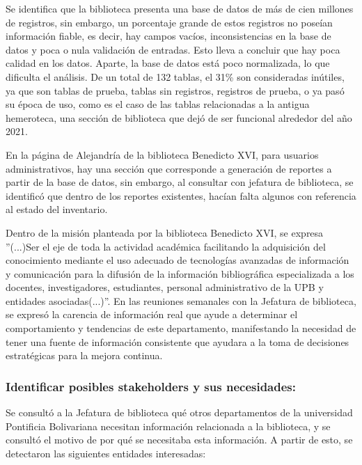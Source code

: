 \documentclass[spanish]{ieee_upb}
\begin{document}
\vspace{0.3cm}
Se identifica que la biblioteca presenta una base de datos de más de cien millones de registros, sin embargo, un porcentaje grande de estos registros no poseían información fiable, es decir, hay campos vacíos, inconsistencias en la base de datos y poca o nula validación de entradas. Esto lleva a concluir que hay poca calidad en los datos. Aparte, la base de datos está poco normalizada, lo que dificulta el análisis. De un total de 132 tablas, el 31\% son consideradas inútiles, ya que son tablas de prueba, tablas sin registros, registros de prueba, o ya pasó su época de uso, como es el caso de las tablas relacionadas a la antigua hemeroteca, una sección de biblioteca que dejó de ser funcional alrededor del año 2021. 

\vspace{0.3cm}
En la página de Alejandría de la biblioteca Benedicto XVI, para usuarios administrativos, hay una sección que corresponde a generación de reportes a partir de la base de datos, sin embargo, al consultar con jefatura de biblioteca, se identificó que dentro de los reportes existentes, hacían falta algunos con referencia al estado del inventario. 

\vspace{0.3cm}
Dentro de la misión planteada por la biblioteca Benedicto XVI, se expresa ''(...)Ser el eje de toda la actividad académica facilitando la adquisición del conocimiento mediante el uso adecuado de tecnologías avanzadas de información y comunicación para la difusión de la información bibliográfica especializada a los docentes, investigadores, estudiantes, personal administrativo de la UPB y entidades asociadas(...)''\cite{UPB_Biblioteca}. En las reuniones semanales con la Jefatura de biblioteca, se expresó la carencia de información real que ayude a determinar el comportamiento y tendencias de este departamento, manifestando la necesidad de tener una fuente de información consistente que ayudara a la toma de decisiones estratégicas para la mejora continua.

\vspace{0.3cm}
\subsubsection{Identificar posibles stakeholders y sus necesidades: }

Se consultó a la Jefatura de biblioteca qué otros departamentos de la universidad Pontificia Bolivariana necesitan información relacionada a la biblioteca, y se consultó el motivo de por qué se necesitaba esta información. A partir de esto, se detectaron las siguientes entidades interesadas:
\end{document}
